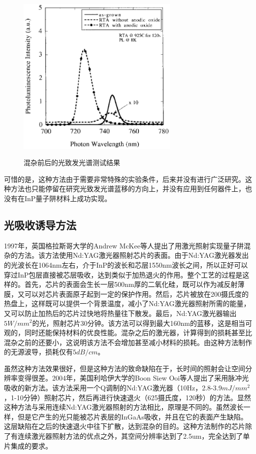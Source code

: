 \documentclass{ZJUthesis}
\begin{document}
\begin{figure}[!ht]
  \centering
  \includegraphics[width=0.7\textwidth]{./Pictures/oxide_pl.eps}\\
  \caption{混杂前后的光致发光谱测试结果}
  \label{fig_oxide_pl}
\end{figure}

可惜的是，这种方法由于需要非常特殊的实验条件，后来并没有进行广泛研究。这种方法也只能停留在研究光致发光谱蓝移的方向上，并没有应用到任何器件上，也没有在InP量子阱材料上成功实现。

\subsection{光吸收诱导方法}

1997年，英国格拉斯哥大学的Andrew McKee等人提出了用激光照射实现量子阱混杂的方法\cite{mckee1997monolithic-PAID}。该方法使用Nd:YAG激光器照射芯片的表面。由于Nd:YAG激光器发出的光波长在1064nm左右，介于InP的波长和芯层1550nm波长之间，所以正好可以穿过InP包层直接被芯层吸收，达到类似于加热退火的作用。整个工艺的过程是这样的。首先，芯片的表面会生长一层500nm厚的二氧化硅，既可以作为减反射薄膜，又可以对芯片表面原子起到一定的保护作用。然后，芯片被放在200摄氏度的热盘上，这样既可以提供一个背景温度，减小了Nd:YAG激光器照射所需的能量，又可以防止加热后的芯片过快地将热量往下散发。最后，Nd:YAG激光器输出$5W/mm^2$的光，照射芯片30分钟。该方法可以得到最大160nm的蓝移，这是相当可观的，同时还能保持材料的优良性能。混杂之后的激光器，计算得到的损耗甚至比混杂之前的还要小，这说明该方法不会增加甚至减小材料的损耗。由这种方法制作的无源波导，损耗仅有$5dB/cm$。

虽然这种方法效果很好，但是这种方法的致命缺陷在于，长时间的照射会让空间分辨率变得很差。2004年，美国利哈伊大学的Boon Siew Ooi等人提出了采用脉冲光吸收的新方法\cite{ooi2004multiple}。该方法采用一个Q调制的Nd:YAG激光器（10Hz，2.8-3.9$mJ/mm^2$，1-10分钟）照射芯片，然后再进行快速退火（625摄氏度，120秒）的方法。显然这种方法与采用连续Nd:YAG激光器照射的方法相比，原理是不同的。虽然波长一样，但是它产生的光只能被芯片表层的InGaAs吸收，并且在它的表面产生缺陷。这层缺陷在之后的快速退火中往下扩散，达到混杂的目的。这种方法制作的芯片除了有连续激光器照射方法的优点之外，其空间分辨率达到了2.5um，完全达到了单片集成的要求。
\end{document}
